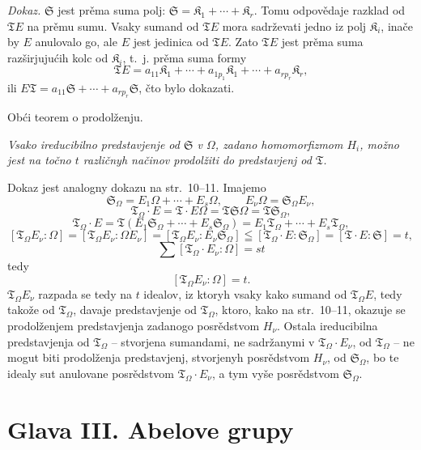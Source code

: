 \documentclass[11pt]{article}
\begin{document}
\emph{Dokaz.} \(\mathfrak S\) jest prěma suma polj: \(\mathfrak S=\mathfrak K_1+\cdots+\mathfrak K_r\). Tomu odpovědaje razklad od \(\mathfrak T E\) na prěmu sumu. Vsaky sumand od \(\mathfrak T E\) mora sadrževati jedno iz polj \(\mathfrak K_i\), inače by \(E\) anulovalo go, ale \(E\) jest jedinica od \(\mathfrak T E\). Zato \(\mathfrak T E\) jest prěma suma razširjujućih kolc od \(\mathfrak K_i\), t.~j. prěma suma formy
\[
\mathfrak T E=a_{11}\mathfrak K_1+\cdots+a_{1p_1}\mathfrak K_1+\cdots+a_{rp_r}\mathfrak K_r,
\]
ili \(E\mathfrak T=a_{11}\mathfrak S+\cdots+a_{rp_r}\mathfrak S\), čto bylo dokazati.

\begin{center}
Obći teorem o prodolženju.
\end{center}

\emph{Vsako ireducibilno predstavjenje od \(\mathfrak S\) v \(\Omega\), zadano homomorfizmom \(H_i\), možno jest na točno \(t\) različnyh načinov prodolžiti do predstavjenj od \(\mathfrak T\).}

Dokaz jest analogny dokazu na str.~10--11. Imajemo
\[
\mathfrak S_\Omega=E_1\Omega+\cdots+E_s\Omega,\qquad
E_\nu\Omega=\mathfrak S_\Omega E_\nu,
\]
\[
\mathfrak T_\Omega\cdot E=\mathfrak T\cdot E\Omega
=\mathfrak T\mathfrak S\Omega=\mathfrak T\mathfrak S_\Omega,
\]
\[
\mathfrak T_\Omega\cdot E
=\mathfrak T(E_1\mathfrak S_\Omega+\cdots+E_s\mathfrak S_\Omega)
=E_1\mathfrak T_\Omega+\cdots+E_s\mathfrak T_\Omega,
\]
\[
[\mathfrak T_\Omega E_\nu:\Omega]
=[\mathfrak T_\Omega E_\nu:\Omega E_\nu]
=[\mathfrak T_\Omega E_\nu:E_\nu\mathfrak S_\Omega]
\leqq[\mathfrak T_\Omega\cdot E:\mathfrak S_\Omega]
=[\mathfrak T\cdot E:\mathfrak S]=t,
\]
\[
\sum[\mathfrak T_\Omega\cdot E_\nu:\Omega]=st
\]
tedy
\[
[\mathfrak T_\Omega E_\nu:\Omega]=t.
\]
\(\mathfrak T_\Omega E_\nu\) razpada se tedy na \(t\) idealov, iz ktoryh vsaky kako sumand od \(\mathfrak T_\Omega E\), tedy takože od \(\mathfrak T_\Omega\), davaje predstavjenje od \(\mathfrak T_\Omega\), ktoro, kako na str.~10--11, okazuje se prodolženjem predstavjenja zadanogo posrědstvom \(H_\nu\). Ostala ireducibilna predstavjenja od \(\mathfrak T_\Omega\) -- stvorjena sumandami, ne sadržanymi v \(\mathfrak T_\Omega\cdot E_\nu\), od \(\mathfrak T_\Omega\) -- ne mogut biti prodolženja predstavjenj, stvorjenyh posrědstvom \(H_\nu\), od \(\mathfrak S_\Omega\), bo te idealy sut anulovane posrědstvom \(\mathfrak T_\Omega\cdot E_\nu\), a tym vyše posrědstvom \(\mathfrak S_\Omega\).

\section*{Glava III. Abelove grupy}\label{kapitel-iii.-abelsche-gruppen}
\end{document}
